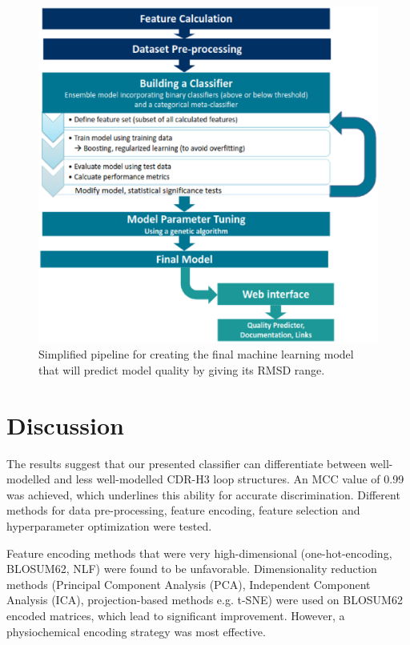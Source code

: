\documentclass[12pt]{article}
\begin{document}
\begin{figure}
  \includegraphics[scale=0.45]{method.eps}
  \caption {Simplified pipeline for creating the final machine
    learning model that will predict model quality by giving its RMSD
    range.}
  \label{fig:method}
\end{figure}



\section{Discussion}
The results suggest that our presented classifier can differentiate
between well-modelled and less well-modelled CDR-H3 loop
structures. An MCC value of 0.99 was achieved, which underlines this
ability for accurate discrimination. Different methods for data
pre-processing, feature encoding, feature selection and hyperparameter
optimization were tested.

Feature encoding methods that were very high-dimensional
(one-hot-encoding, BLOSUM62, NLF) were found to be
unfavorable. Dimensionality reduction methods (Principal Component
Analysis (PCA), Independent Component Analysis (ICA), projection-based
methods e.g. t-SNE) were used on BLOSUM62 encoded matrices, which lead
to significant improvement. However, a physiochemical encoding
strategy was most effective.
\end{document}
